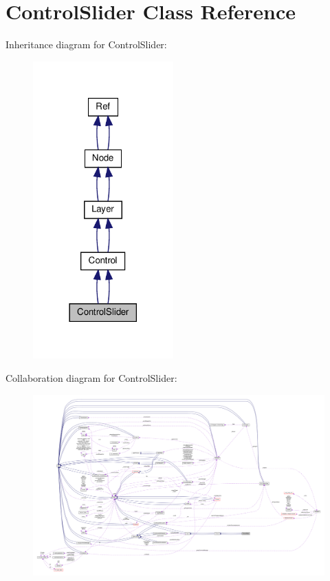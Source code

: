 \hypertarget{classControlSlider}{}\section{Control\+Slider Class Reference}
\label{classControlSlider}


Inheritance diagram for Control\+Slider\+:
\nopagebreak
\begin{figure}[H]
\begin{center}
\leavevmode
\includegraphics[width=153pt]{classControlSlider__inherit__graph}
\end{center}
\end{figure}


Collaboration diagram for Control\+Slider\+:
\nopagebreak
\begin{figure}[H]
\begin{center}
\leavevmode
\includegraphics[width=350pt]{classControlSlider__coll__graph}
\end{center}
\end{figure}
